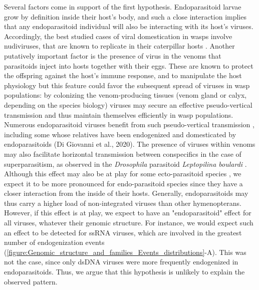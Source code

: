 Several factors come in support of the first hypothesis. Endoparasitoid larvae grow by definition inside their host's body, and such a close interaction implies that any endoparasitoid individual will also be interacting with its host's viruses. Accordingly, the best studied cases of viral domestication in wasps involve nudiviruses, that are known to replicate in their caterpillar hosts \citep{burke_rapid_2018,pichon_recurrent_2015,bezier_polydnaviruses_2009-1}. Another putatively important factor is the presence of virus in the venoms that parasitoids inject into hosts together with their eggs. These are known to protect the offspring against the host's immune response, and to manipulate the host physiology \citep{asgari_venom_2011} but this feature could favor the subsequent spread of viruses in wasp populations: by colonizing the venom-producing tissues (venom gland or calyx, depending on the species biology) viruses may secure an effective pseudo-vertical transmission and  thus maintain themselves efficiently in wasp populations. Numerous endoparasitoid viruses benefit from such pseudo-vertical transmission  \citep{varaldi_artifical_2006,renault_cypovirus_2003}, including some whose relatives have been endogenized and domesticated by endoparasitoids (Di Giovanni et al., 2020). The presence of viruses within venoms may also facilitate horizontal transmission between conspecifics in the case of superparasitism, as observed in the \textit{Drosophila} parasitoid \textit{Leptopilina boulardi} \citep{varaldi_infectious_2003}. Although this effect may also be at play for some ecto-parasitoid species \citep{zhang_novel_2021}, we expect it to be more pronounced for endo-parasitoid species since they have a closer interaction from the inside of their hosts. 
Generally, endoparasitoids may thus carry a higher load of non-integrated viruses than other hymenopterans. However, if this effect is at play, we expect to have an "endoparasitoid" effect for all viruses, whatever their genomic structure. For instance, we would expect such an effect to be detected for ssRNA viruses, which are involved in the greatest number of endogenization events (\figurename{\ref{figure:Genomic_structure_and_families_Events_distributions}}-A).  This was not the case, since only dsDNA viruses were more frequently endogenized in endoparasitoids. Thus, we argue that this hypothesis is unlikely to explain the observed pattern.

